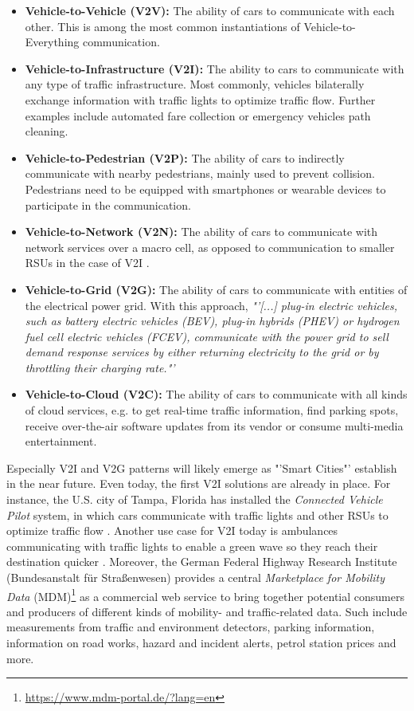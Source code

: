 \begin{itemize}
	\item \textbf{Vehicle-to-Vehicle (V2V):} The ability of cars to communicate with each other. This is among the most common instantiations of Vehicle-to-Everything communication. 
	\item  \textbf{Vehicle-to-Infrastructure (V2I):} The ability to cars to communicate with any type of traffic infrastructure. Most commonly, vehicles bilaterally exchange information with traffic lights to optimize traffic flow. Further examples include automated fare collection or emergency vehicles path cleaning.
	\item \textbf{Vehicle-to-Pedestrian (V2P):} The ability of cars to indirectly communicate with nearby pedestrians, mainly used to prevent collision. Pedestrians need to be equipped with smartphones or wearable devices to participate in the communication.
	\item \textbf{Vehicle-to-Network (V2N):} The ability of cars to communicate with network services over a macro cell, as opposed to communication to smaller RSUs in the case of V2I \cite{Abou-zeid19}. 
	\item \textbf{Vehicle-to-Grid (V2G):} The ability of cars to communicate with entities of the electrical power grid. With this approach, \textit{"'[...] plug-in electric vehicles, such as battery electric vehicles (BEV), plug-in hybrids (PHEV) or hydrogen fuel cell electric vehicles (FCEV), communicate with the power grid to sell demand response services by either returning electricity to the grid or by throttling their charging rate."'} \cite{wiki:v2g}
	\item \textbf{Vehicle-to-Cloud (V2C):} The ability of cars to communicate with all kinds of cloud services, e.g. to get real-time traffic information, find parking spots, receive over-the-air software updates from its vendor or consume multi-media entertainment.
\end{itemize}

Especially V2I and V2G patterns will likely emerge as "'Smart Cities"' establish in the near future. Even today, the first V2I solutions are already in place. For instance, the U.S. city of Tampa, Florida has installed the \textit{Connected Vehicle Pilot} system, in which cars communicate with traffic lights and other RSUs to optimize traffic flow \cite{TampaHillsboroughExpresswayAuthority2018}. Another use case for V2I today is ambulances communicating with traffic lights to enable a green wave so they reach their destination quicker \cite{IsrealHomelandSecurity2019}. Moreover, the German Federal Highway Research Institute (Bundesanstalt für Straßenwesen) provides a central \textit{Marketplace for Mobility Data} (MDM)\footnote{\url{https://www.mdm-portal.de/?lang=en}} as a commercial web service to bring together potential consumers and producers of different kinds of mobility- and traffic-related data. Such include measurements from traffic and environment detectors, parking information, information on road works, hazard and incident alerts, petrol station prices and more.
\par
\bigskip

